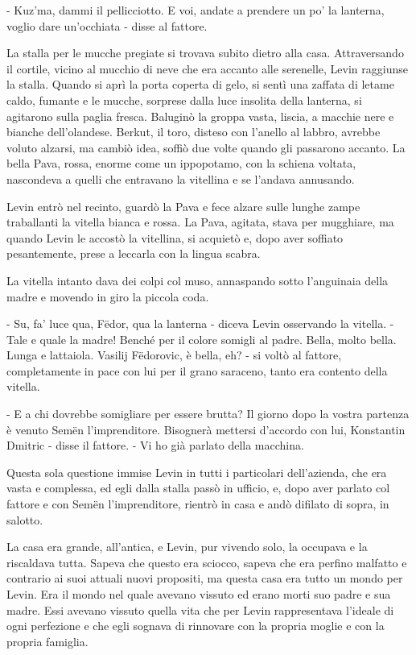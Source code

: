 - Kuz'ma, dammi il pellicciotto. E voi, andate a prendere un po' la lanterna, voglio dare un'occhiata - disse al fattore. 

La stalla per le mucche pregiate si trovava subito dietro alla casa. Attraversando il cortile, vicino al mucchio di neve che era accanto alle serenelle, Levin raggiunse la stalla. Quando si aprì la porta coperta di gelo, si sentì una zaffata di letame caldo, fumante e le mucche, sorprese dalla luce insolita della lanterna, si agitarono sulla paglia fresca. Baluginò la groppa vasta, liscia, a macchie nere e bianche dell'olandese. Berkut, il toro, disteso con l'anello al labbro, avrebbe voluto alzarsi, ma cambiò idea, soffiò due volte quando gli passarono accanto. La bella Pava, rossa, enorme come un ippopotamo, con la schiena voltata, nascondeva a quelli che entravano la vitellina e se l'andava annusando. 

Levin entrò nel recinto, guardò la Pava e fece alzare sulle lunghe zampe traballanti la vitella bianca e rossa. La Pava, agitata, stava per mugghiare, ma quando Levin le accostò la vitellina, si acquietò e, dopo aver soffiato pesantemente, prese a leccarla con la lingua scabra. 

La vitella intanto dava dei colpi col muso, annaspando sotto l'anguinaia della madre e movendo in giro la piccola coda. 

- Su, fa' luce qua, Fëdor, qua la lanterna - diceva Levin osservando la vitella. - Tale e quale la madre! Benché per il colore somigli al padre. Bella, molto bella. Lunga e lattaiola. Vasilij Fëdorovic, è bella, eh? - si voltò al fattore, completamente in pace con lui per il grano saraceno, tanto era contento della vitella. 

- E a chi dovrebbe somigliare per essere brutta? Il giorno dopo la vostra partenza è venuto Semën l'imprenditore. Bisognerà mettersi d'accordo con lui, Konstantin Dmitric - disse il fattore. - Vi ho già parlato della macchina. 

Questa sola questione immise Levin in tutti i particolari dell'azienda, che era vasta e complessa, ed egli dalla stalla passò in ufficio, e, dopo aver parlato col fattore e con Semën l'imprenditore, rientrò in casa e andò difilato di sopra, in salotto. 

\label{xxvii} 

La casa era grande, all'antica, e Levin, pur vivendo solo, la occupava e la riscaldava tutta. Sapeva che questo era sciocco, sapeva che era perfino malfatto e contrario ai suoi attuali nuovi propositi, ma questa casa era tutto un mondo per Levin. Era il mondo nel quale avevano vissuto ed erano morti suo padre e sua madre. Essi avevano vissuto quella vita che per Levin rappresentava l'ideale di ogni perfezione e che egli sognava di rinnovare con la propria moglie e con la propria famiglia. 

